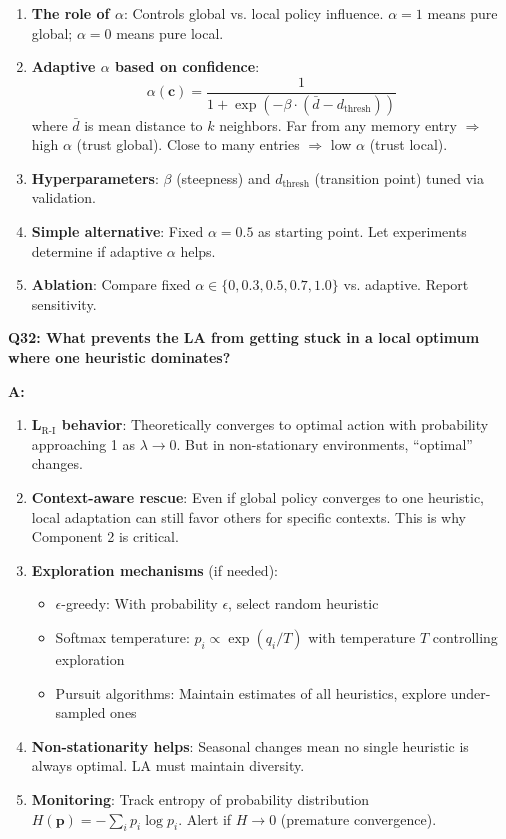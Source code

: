 \documentclass[11pt]{article}
\begin{document}
\begin{enumerate}
    \item \textbf{The role of $\alpha$}: Controls global vs. local policy influence. $\alpha=1$ means pure global; $\alpha=0$ means pure local.

    \item \textbf{Adaptive $\alpha$ based on confidence}:
    \[
    \alpha(\mathbf{c}) = \frac{1}{1 + \exp(-\beta \cdot (\bar{d} - d_{\text{thresh}}))}
    \]
    where $\bar{d}$ is mean distance to $k$ neighbors. Far from any memory entry $\Rightarrow$ high $\alpha$ (trust global). Close to many entries $\Rightarrow$ low $\alpha$ (trust local).

    \item \textbf{Hyperparameters}: $\beta$ (steepness) and $d_{\text{thresh}}$ (transition point) tuned via validation.

    \item \textbf{Simple alternative}: Fixed $\alpha = 0.5$ as starting point. Let experiments determine if adaptive $\alpha$ helps.

    \item \textbf{Ablation}: Compare fixed $\alpha \in \{0, 0.3, 0.5, 0.7, 1.0\}$ vs. adaptive. Report sensitivity.
\end{enumerate}

\textbf{Q32: What prevents the LA from getting stuck in a local optimum where one heuristic dominates?}

\textbf{A:}

\begin{enumerate}
    \item \textbf{L$_{\text{R-I}}$ behavior}: Theoretically converges to optimal action with probability approaching 1 as $\lambda \to 0$. But in non-stationary environments, ``optimal'' changes.

    \item \textbf{Context-aware rescue}: Even if global policy converges to one heuristic, local adaptation can still favor others for specific contexts. This is why Component 2 is critical.

    \item \textbf{Exploration mechanisms} (if needed):
    \begin{itemize}
        \item $\epsilon$-greedy: With probability $\epsilon$, select random heuristic
        \item Softmax temperature: $p_i \propto \exp(q_i / T)$ with temperature $T$ controlling exploration
        \item Pursuit algorithms: Maintain estimates of all heuristics, explore under-sampled ones
    \end{itemize}

    \item \textbf{Non-stationarity helps}: Seasonal changes mean no single heuristic is always optimal. LA must maintain diversity.

    \item \textbf{Monitoring}: Track entropy of probability distribution $H(\mathbf{p}) = -\sum_i p_i \log p_i$. Alert if $H \to 0$ (premature convergence).
\end{enumerate}
\end{document}
